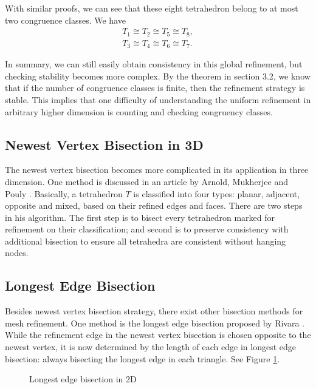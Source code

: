 With similar proofs, we can see that these eight tetrahedron belong to at most two congruence classes. We have
\begin{align*}
T_1 \cong T_2 \cong T_5 \cong T_8, \\
T_3 \cong T_4 \cong T_6 \cong T_7.
\end{align*}

In summary, we can still easily obtain consistency in this global refinement, but checking stability becomes more complex. By the theorem in section 3.2, we know that if the number of congruence classes is finite, then the refinement strategy is stable. This implies that one difficulty of understanding the uniform refinement in arbitrary higher dimension is counting and checking congruency classes.

\subsection{Newest Vertex Bisection in 3D}
The newest vertex bisection becomes more complicated in its application in three dimension. One method is discussed in an article by Arnold, Mukherjee and Pouly \cite{arnold2000locally}. 
Basically, a tetrahedron $T$ is classified into four types: planar, adjacent, opposite and mixed, based on their refined edges and faces. There are two steps in his algorithm. The first step is to bisect every tetrahedron marked for refinement on their classification; and second is to preserve consistency with additional bisection to ensure all tetrahedra are consistent without hanging nodes.

\subsection{Longest Edge Bisection}
Besides newest vertex bisection strategy, there exist other bisection methods for mesh refinement. One method is the longest edge bisection proposed by Rivara \cite{rivara1984mesh}. While the refinement edge in the newest vertex bisection is chosen opposite to the newest vertex, it is now determined by the length of each edge in longest edge bisection: always bisecting the longest edge in each triangle. See Figure \ref{Fig14}.

\begin{figure}[h!]
\centering
{}
\caption{Longest edge bisection in 2D}
\label{Fig14}
\end{figure}

